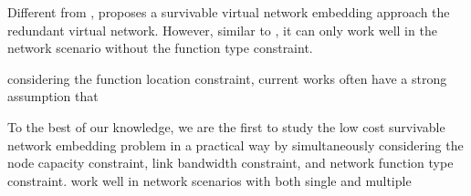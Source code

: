 Different from \cite{patel2014survivable,yeow2010designing,yu2011cost}, \cite{guo2014survivable} proposes a survivable virtual network embedding approach  the redundant virtual network. However, similar to  \cite{rahman2013svne},  it can only work well in the network scenario without the function type constraint.

 considering the function location constraint,   current works \cite{rahman2010survivable,koslovski2010reliability,yu2017survivable,patel2014survivable} often have a strong assumption that 


To the best of our knowledge, we are the first to study the low cost survivable network embedding problem in a practical way by simultaneously considering the node capacity constraint, link bandwidth constraint, and network function type constraint.  work well in network scenarios with both single and  multiple 
